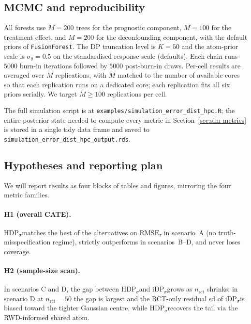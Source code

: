 \documentclass[11pt]{article}
\theoremstyle{plain}
\theoremstyle{definition}
\theoremstyle{remark}
\newcommand{\1}{\mathds{1}}
\newcommand{\miDPs}{\ensuremath{\mathrm{iDP}_\sigma}}
\newcommand{\mHDPs}{\ensuremath{\mathrm{HDP}_\sigma}}
\begin{document}
\subsection{MCMC and reproducibility}
\label{sec:sim-mcmc}

All forests use $M = 200$ trees for the prognostic component, $M = 100$
for the treatment effect, and $M = 200$ for the deconfounding
component, with the default priors of \texttt{FusionForest}. The DP
truncation level is $K = 50$ and the atom-prior scale is
$\sigma_\theta = 0.5$ on the standardised response scale (defaults).
Each chain runs $5000$ burn-in iterations followed by $5000$ post-burn-in
draws. Per-cell results are averaged over $M$ replications, with $M$
matched to the number of available cores so that each replication runs
on a dedicated core; each replication fits all six priors serially. We
target $M \geq 100$ replications per cell.

The full simulation script is at
\texttt{examples/simulation\_error\_dist\_hpc.R}; the entire posterior
state needed to compute every metric in
Section~\ref{sec:sim-metrics} is stored in a single tidy data frame and
saved to \texttt{simulation\_error\_dist\_hpc\_output.rds}.

\subsection{Hypotheses and reporting plan}
\label{sec:sim-hypotheses}

We will report results as four blocks of tables and figures, mirroring
the four metric families.

\paragraph{H1 (overall CATE).}
\mHDPs matches the best of the alternatives on
$\mathrm{RMSE}_\tau$ in scenario~A (no truth-misspecification regime),
strictly outperforms in scenarios~B--D, and never loses coverage.

\paragraph{H2 (sample-size scan).}
In scenarios C and D, the gap between \mHDPs and
\miDPs grows as $n_{\text{rct}}$ shrinks; in
scenario D at $n_{\text{rct}} = 50$ the gap is largest and the
RCT-only residual sd of \miDPs is biased toward the
tighter Gaussian centre, while \mHDPs recovers the
tail via the RWD-informed shared atom.
\end{document}
